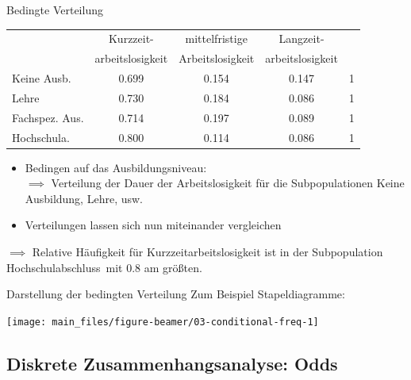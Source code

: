 \documentclass[
  10pt,
  ignorenonframetext,
]{beamer}
\providecommand{\tightlist}{%
  \setlength{\itemsep}{0pt}\setlength{\parskip}{0pt}}
\begin{document}
\begin{frame}{Bedingte Verteilung}
\label{bedingte-verteilung}
\begin{center}
  \begin{small}
   \begin{tabular}{l|ccc|c}
\multicolumn{1}{c}{}
& \multicolumn{1}{c}{Kurzzeit-}
  & \multicolumn{1}{c}{mittelfristige}
    & \multicolumn{1}{c}{Langzeit-}\\
\multicolumn{1}{c}{}
& \multicolumn{1}{c}{arbeitslosigkeit}
  & \multicolumn{1}{c}{Arbeitslosigkeit}
    & \multicolumn{1}{c}{arbeitslosigkeit}\\\cline{2-4}
Keine Ausb.     & 0.699 & 0.154 & 0.147 & 1\\
Lehre                & 0.730 & 0.184 & 0.086 & 1\\
Fachspez. Aus. & 0.714 & 0.197 & 0.089 & 1\\
Hochschula.    & 0.800 & 0.114 & 0.086 & 1\\\cline{2-4}
    \end{tabular}
   \end{small}
  \end{center}

\begin{itemize}
\tightlist
\item
  Bedingen auf das Ausbildungsniveau:\\
  \(\implies\) Verteilung der Dauer der Arbeitslosigkeit für die
  Subpopulationen \grqq Keine Ausbildung\grqq, \grqq Lehre\grqq, usw.
\item
  Verteilungen lassen sich nun miteinander vergleichen
\end{itemize}

\(\implies\) Relative Häufigkeit für Kurzzeitarbeitslosigkeit ist in der
Subpopulation \grqq Hochschulabschluss\grqq~mit \(0.8\) am größten.
\end{frame}

\begin{frame}{Darstellung der bedingten Verteilung}
\label{darstellung-der-bedingten-verteilung}
Zum Beispiel Stapeldiagramme:

\scriptsize

\begin{center}\texttt{[image: main\_files/figure-beamer/03-conditional-freq-1]} \end{center}

\normalsize
\end{frame}

\subsection{Diskrete Zusammenhangsanalyse:
Odds}\label{diskrete-zusammenhangsanalyse-odds}
\end{document}
